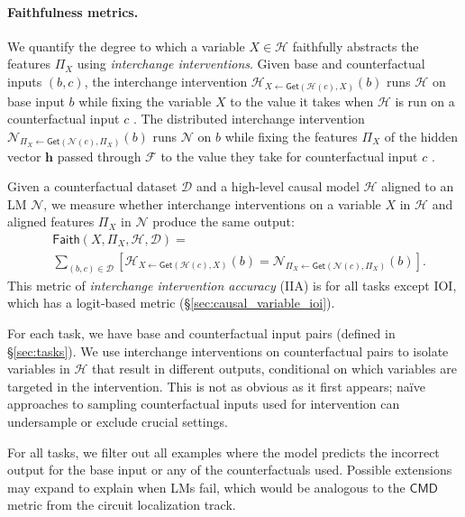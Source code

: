 \documentclass{article}
\theoremstyle{plain}
\theoremstyle{definition}
\theoremstyle{remark}
\begin{document}
\paragraph{Faithfulness metrics.} 
We quantify the degree to which a variable $X \in \mathcal{H}$ faithfully abstracts the features $\Pi_X$ using \textit{interchange interventions}. Given base and counterfactual inputs $(b,c)$, the interchange intervention $\mathcal{H} _{X \leftarrow \mathsf{Get}(\mathcal{H}(c), X)}(b)$ runs $\mathcal{H}$ on base input $b$ while fixing the variable $X$ to the value it takes when $\mathcal{H}$ is run on a counterfactual input $c$ \cite{vig2020, geiger-etal-2020-neural}. The distributed interchange intervention $\mathcal{N}_{\Pi_X \leftarrow \mathsf{Get}(\mathcal{N}({c}), \Pi_X)}(b)$ runs $\mathcal{N}$ on $b$ while fixing the features $\Pi_X$ of the hidden vector $\mathbf{h}$ passed through $\mathcal{F}$ to the value they take for counterfactual input $c$ \cite{ Wu2023, amini-etal-2023-naturalistic, Geiger2024DAS}. 

Given a counterfactual dataset $\mathcal{D}$ and a high-level causal model $\mathcal{H}$ aligned to an LM $\mathcal{N}$, we measure whether interchange interventions on a variable $X$ in $\mathcal{H}$ and aligned features $\Pi_X$ in $\mathcal{N}$ produce the same output:
\begin{align*}
&\mathsf{Faith}(X, \Pi_X, \mathcal{H}, \mathcal{D}) =\\
&\sum_{(b,c) \in \mathcal{D}}\left[\mathcal{H} _{X \leftarrow \mathsf{Get}(\mathcal{H}(c), X)}(b)=\mathcal{N}_{\Pi_X \leftarrow \mathsf{Get}(\mathcal{N}({c}), \Pi_X)}(b)\right].
\end{align*}
This metric of \textit{interchange intervention accuracy} (IIA) is for all tasks except IOI, which has a logit-based metric (\S\ref{sec:causal_variable_ioi}).

For each task, we have base and counterfactual input pairs (defined in \S\ref{sec:tasks}). We use interchange interventions on counterfactual pairs to isolate variables in $\mathcal{H}$ that result in different outputs, conditional on which variables are targeted in the intervention. This is not as obvious as it first appears; naïve approaches to sampling counterfactual inputs used for intervention can undersample or exclude crucial settings. 

For all tasks, we filter out all examples where the model predicts the incorrect output for the base input or any of the counterfactuals used. Possible extensions may expand to explain when LMs fail, which would be analogous to the $\mathsf{CMD}$ metric from the circuit localization track.
\end{document}
